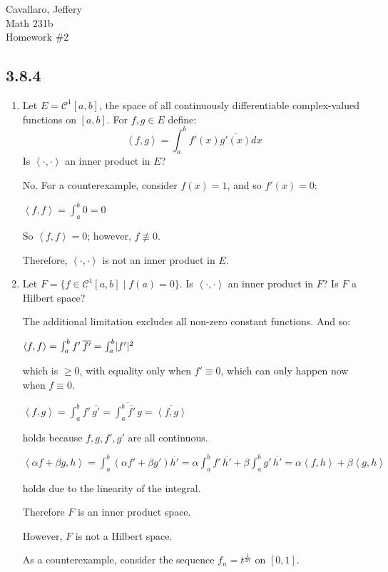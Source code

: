 \documentclass[letterpaper,12pt,fleqn]{article}
\newcommand{\mc}{\mathcal{C}}
\newcommand{\inner}[2]{\left<#1,#2\right>}
\newcommand{\conj}[1]{\overline{#1}}
\renewcommand{\a}{\alpha}
\renewcommand{\b}{\beta}
\begin{document}
Cavallaro, Jeffery \\
Math 231b \\
Homework \#2

\subsection*{3.8.4}

\begin{enumerate}[label=(\alph*)]
\item Let $E=\mc^1[a,b]$, the space of all continuously differentiable
  complex-valued functions on $[a,b]$. For $f,g\in E$ define:
  \[\inner{f}{g}=\int_a^bf'(x)\conj{g'(x)}dx\]
  Is $\inner{\cdot}{\cdot}$ an inner product in $E$?

  \bigskip

  No. For a counterexample, consider $f(x)=1$, and so $f'(x)=0$:

  $\inner{f}{f}=\int_a^b0=0$

  So $\inner{f}{f}=0$; however, $f\not\equiv0$.

  Therefore, $\inner{\cdot}{\cdot}$ is not an inner product in $E$.

  \bigskip

\item Let $F=\{f\in\mc^1[a,b]\mid f(a)=0\}$. Is $\inner{\cdot}{\cdot}$ an
  inner product in $F$? Is $F$ a Hilbert space?

  The additional limitation excludes all non-zero constant functions. And so:

  $\inner{f}{f}=\int_a^bf'\,\conj{f'}=\int_a^b\abs{f'}^2$

  which is $\ge0$, with equality only when $f'\equiv0$, which can only happen
  now when $f\equiv0$.

  $\inner{f}{g}=\int_a^bf'\,\conj{g'}=\conj{\int_a^b\conj{f'}\,g}=
  \conj{\inner{f}{g}}$

  holds because $f,g,f',g'$ are all continuous.

  $\inner{\a f+\b g}{h}=\int_a^b(\a f'+\b g')\conj{h'}=
  \a\int_a^bf'\,\conj{h'}+\b\int_a^bg'\,\conj{h'}=
  \a\inner{f}{h}+\b\inner{g}{h}$

  holds due to the linearity of the integral.

  Therefore $F$ is an inner product space.

  However, $F$ is not a Hilbert space.

  As a counterexample, consider the sequence $f_n=t^{\frac{1}{2n}}$ on $[0,1]$.


\end{enumerate}
\end{document}
